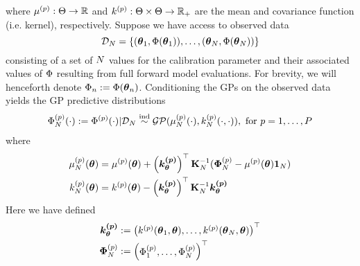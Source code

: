 \documentclass[12pt]{article}
\begin{document}
where $\mu^{(p)}: \Theta \to \mathbb{R}$ and $k^{(p)}: \Theta \times \Theta \to \mathbb{R}_+$ are the mean and covariance function (i.e. kernel), respectively. 
Suppose we have access to observed data 
\[\mathcal{D}_{N} = \left\{(\boldsymbol{\theta}_1, \Phi(\boldsymbol{\theta}_1)), \dots, (\boldsymbol{\theta}_{N}, \Phi(\boldsymbol{\theta}_{N})) \right\}\]
consisting of a set of $N$ values for the calibration parameter and their associated values of $\Phi$ resulting from full forward model evaluations. For brevity, we will henceforth denote 
$\Phi_{n} := \Phi(\boldsymbol{\theta}_{n})$. Conditioning the GPs on the observed data yields the GP predictive distributions
\begin{align} 
\Phi_{N}^{(p)}(\cdot) := \Phi^{(p)}(\cdot)|\mathcal{D}_{N} \overset{\text{ind}}{\sim} \mathcal{GP}(\mu_{N}^{(p)}(\cdot), k_{N}^{(p)}(\cdot, \cdot)), \text{ for } p = 1, \dots, P
\end{align}
where 
\begin{align}
\mu_{N}^{(p)}(\boldsymbol{\theta}) &= \mu^{(p)}(\boldsymbol{\theta}) + \left(\boldsymbol{k^{(p)}_{\boldsymbol{\theta}}}\right)^\top \mathbf{K}_{N}^{-1} (\boldsymbol{\Phi}_{N}^{(p)} - \mu^{(p)}(\boldsymbol{\theta}) \boldsymbol{1}_{N}) \label{GP_pred_mean} \\ 
k_{N}^{(p)}(\boldsymbol{\theta}) &= k^{(p)}(\boldsymbol{\theta}) - \left(\boldsymbol{k^{(p)}_{\boldsymbol{\theta}}}\right)^\top \mathbf{K}_{N}^{-1} \boldsymbol{k^{(p)}_{\boldsymbol{\theta}}} \label{GP_pred_var}
\end{align}
Here we have defined 
\begin{align}
\boldsymbol{k^{(p)}_{\boldsymbol{\theta}}} &:= \begin{pmatrix} k^{(p)}(\boldsymbol{\theta}_1, \boldsymbol{\theta}), \dots, k^{(p)}(\boldsymbol{\theta}_{N}, \boldsymbol{\theta})  \end{pmatrix}^\top \\ 
\boldsymbol{\Phi}_{N}^{(p)} &:= \begin{pmatrix} \Phi_{1}^{(p)}, \dots, \Phi_{N}^{(p)} \end{pmatrix}^{\top}
\end{align}

\end{document}
